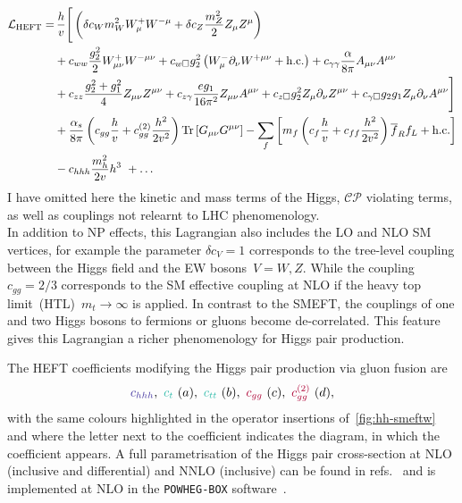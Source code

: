 \begin{align}\nonumber
	\mathcal{L}_{\mathrm{HEFT}} = & \, \frac{h}{v} \Bigg[  \left( \delta c_W m_W^2 W_{\mu}^+W^{-\mu} +\delta c_Z \frac{m_Z^2}{2} Z_\mu Z^\mu\right)  \\\nonumber
	&+c_{ww}\frac{g_2^2}{2}W_{\mu\nu}^+W^{-\mu\nu} + c_{w\square} g_2^2\left(W_{\mu}^-\partial_\nu W^{+\mu\nu} + \text{h.c.}\right) +  c_{\gamma\gamma}\frac{\alpha}{8 \pi}A_{\mu\nu}A^{\mu\nu} \\\nonumber
	& +c_{zz}\frac{g_2^2 + g_1^2}{4} Z_{\mu\nu}Z^{\mu\nu}+ c_{z\gamma}\frac{e g_1}{16 \pi^2}Z_{\mu\nu}A^{\mu\nu}
	+c_{z\square}g_2^2Z_\mu\partial_\nu Z^{\mu\nu}
	+c_{\gamma \square}g_2 g_1 Z_\mu\partial_\nu A^{\mu\nu}
	\Bigg]\\\nonumber
	&+ \frac{\alpha_s}{8 \pi} \left( c_{gg} \frac{h}{v} +  c_{gg}^{(2)} \frac{h^2}{2 v^2}\right) \mbox{Tr}\,[G_{\mu\nu} G^{\mu\nu}]
	-\sum_f \left[ m_f \left(c_f \frac{h}{v} + c _{ff} \frac{h^2}{2v^2}\right) \overline{f}_{R}f_{L}+\text{h.c.}\right]\\
	& - c_{hhh} \frac{m_h^2}{2 v} h^3\ + \dots\label{eq:coupl_def}
\end{align}
I have omitted here the kinetic and mass terms of the Higgs, $\mathcal{CP}$ violating terms, as well as couplings not relearnt to LHC phenomenology. \\
In addition to NP effects, this Lagrangian also includes the LO and NLO SM vertices, for example the parameter $\delta c_V=1$ corresponds to the tree-level coupling between the Higgs field and the EW bosons~$ V=W, Z$. While the coupling $c_{gg}= 2/3$ corresponds to the SM effective coupling at NLO if the heavy top limit~(HTL)~$m_t \to \infty$ is applied. 
In contrast to the SMEFT, the couplings of one and two Higgs bosons to fermions or gluons become de-correlated. This feature gives this Lagrangian a richer phenomenology for Higgs pair production.  
\par The HEFT coefficients modifying the Higgs pair production via gluon fusion are 
\begin{equation}
	\textcolor[HTML]{4334a0}{c_{hhh} }, \ 	\textcolor[HTML]{2ebbaa}{c_t}\ (a) , \  	\textcolor[HTML]{2ebbaa}{c_{tt}} \ (b), \  \textcolor[HTML]{ae0034}{c_{gg}} \ (c), \  \textcolor[HTML]{ae0034}{c_{gg}^{(2)}} \ (d),
\end{equation}
with the same colours highlighted in the operator insertions of~\autoref{fig:hh-smeftw} and where the letter next to the coefficient indicates the diagram, in which the coefficient appears.  A full parametrisation of the Higgs pair cross-section at NLO (inclusive and differential) and NNLO (inclusive) can be found in refs.~\cite{Buchalla:2018yce,Capozi:2019xsi,deFlorian:2021azd} and is implemented at NLO in the \texttt{POWHEG-BOX} software~\cite{Heinrich:2020ckp}. \\

